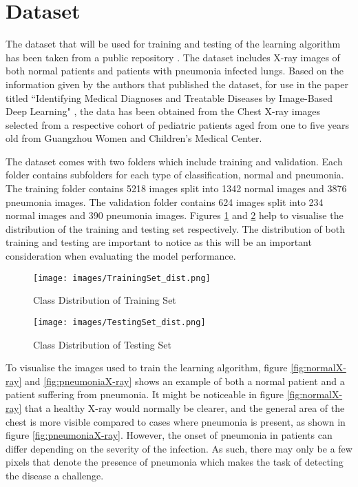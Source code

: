 \section{Dataset}


The dataset that will be used for training and testing of the learning algorithm has been taken from a public repository \cite{Dataset}. The dataset includes X-ray images of both normal patients and patients with pneumonia infected lungs. Based on the information given by the authors that published the dataset, for use in the paper titled ``Identifying Medical Diagnoses and Treatable Diseases by Image-Based Deep Learning"  \cite{kermany2018identifying}, the data has been obtained from the Chest X-ray images selected from a respective cohort of pediatric patients aged from one to five years old from Guangzhou Women and Children's Medical Center. 

The dataset comes with two folders which include training and validation. Each folder contains subfolders for each type of classification, normal and pneumonia. The training folder contains 5218 images split into 1342 normal images and 3876 pneumonia images. The validation folder contains 624 images split into 234 normal images and 390 pneumonia images.
Figures \ref{fig:TrainingDist} and \ref{fig:TestingDist} help to visualise the distribution of the training and testing set respectively. The distribution of both training and testing are important to notice as this will be an important consideration when evaluating the model performance. 

  \begin{figure}[H]
 	\centering
 	\texttt{[image: images/TrainingSet\_dist.png]}
 	\caption{Class Distribution of Training Set}
 	\label{fig:TrainingDist}
 \end{figure}
 
 \begin{figure}[H]
 	\centering
 	\texttt{[image: images/TestingSet\_dist.png]}
 	\caption{Class Distribution of Testing Set }
 	\label{fig:TestingDist}
 \end{figure}

To visualise the images used to train the learning algorithm, figure \ref{fig:normalX-ray} and \ref{fig:pneumoniaX-ray} shows an example of both a normal patient and a patient suffering from pneumonia. It might be noticeable in figure \ref{fig:normalX-ray} that a healthy X-ray would normally be clearer, and the general area of the chest is more visible compared to cases where pneumonia is present, as shown in figure \ref{fig:pneumoniaX-ray}. However, the onset of pneumonia in patients can differ depending on the severity of the infection. As such, there may only be a few pixels that denote the presence of pneumonia which makes the task of detecting the disease a challenge. 

